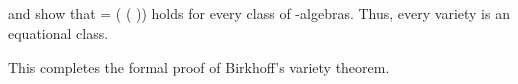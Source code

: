 \begin{itemize}
\begin{code}
\AgdaSpace{}%
\AgdaSpace{}%
\AgdaSpace{}%
\AgdaSpace{}%
\AgdaSpace{}%
\AgdaOperator{\AgdaFunction{𝔽[}}\AgdaSpace{}%
\AgdaOperator{\AgdaFunction{𝕌[}}\AgdaSpace{}%
\AgdaSpace{}%
\AgdaOperator{\AgdaFunction{]}}\AgdaSpace{}%
\AgdaOperator{\AgdaFunction{]}}\<%
\\
%
\>[2]\AgdaSpace{}%
\AgdaSymbol{=}\AgdaSpace{}%
\AgdaSpace{}%
\AgdaOperator{\AgdaFunction{𝔽[}}\AgdaSpace{}%
\AgdaOperator{\AgdaFunction{𝕌[}}\AgdaSpace{}%
\AgdaSpace{}%
\AgdaOperator{\AgdaFunction{]}}\AgdaSpace{}%
\AgdaOperator{\AgdaFunction{]}}\AgdaSpace{}%
\AgdaSymbol{(}\AgdaSpace{}%
\AgdaSpace{}%
\AgdaSpace{}%
\AgdaSymbol{)}\AgdaSpace{}%
\<%
\\
%
\>[2]\AgdaSpace{}%
\AgdaSymbol{:}\AgdaSpace{}%
\AgdaSpace{}%
\AgdaSpace{}%
\AgdaOperator{\AgdaFunction{𝔽[}}\AgdaSpace{}%
\AgdaOperator{\AgdaFunction{𝕌[}}\AgdaSpace{}%
\AgdaSpace{}%
\AgdaOperator{\AgdaFunction{]}}\AgdaSpace{}%
\AgdaOperator{\AgdaFunction{]}}\<%
\\
%
\>[2]\AgdaSpace{}%
\AgdaSymbol{=}\AgdaSpace{}%
\AgdaSpace{}%
\AgdaSpace{}%
\AgdaSpace{}%
\AgdaSymbol{(}\AgdaSpace{}%
\AgdaSymbol{)}\AgdaOperator{\AgdaInductiveConstructor{,}}\AgdaSpace{}%
\AgdaSpace{}%
\AgdaSymbol{\AgdaUnderscore{}}\AgdaSpace{}%
\AgdaSymbol{\AgdaUnderscore{}}\AgdaSpace{}%
\AgdaSpace{}%
\AgdaSpace{}%
\AgdaSymbol{(}\AgdaSymbol{(}\AgdaSymbol{\{}\AgdaSpace{}%
\AgdaSymbol{=}\AgdaSpace{}%
\AgdaSymbol{\}))}\<%
\\
\>[0]\<%
\end{code}
 and  show that
  =  ( ( )) holds for every class  of -algebras.
Thus, every variety is an equational class. 
\end{itemize}

This completes the formal proof of Birkhoff's variety theorem.

